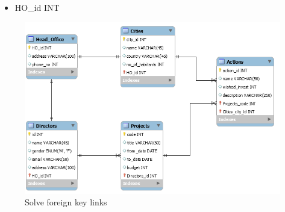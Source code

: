 \documentclass{article}
\begin{document}
\begin{itemize}
\begin{itemize}
		\item HO\_id INT
	\end{itemize}
\begin{figure}[h]
\centering
\includegraphics[scale = 0.6]{4.PNG}
\caption{Solve foreign key links}
\end{figure}
\end{itemize}
\newpage
\end{document}
